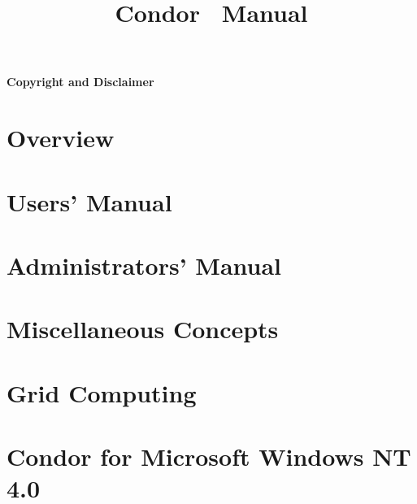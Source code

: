 \documentclass[titlepage,oneside]{book}
\begin{document}
\title{Condor\textsuperscript{\small{\textregistered}} \VersionNotice\ Manual}
\author{\AuthorNotice}
\maketitle


\tableofcontents

\sloppy
\begin{small}
\subsubsection*{Copyright and Disclaimer}
\label{sec:copyright-and-disclaimer}

\end{small}

\newpage
{}

\chapter{Overview}
\label{overview}


\chapter{Users' Manual}
\label{user-manual}


\chapter{Administrators' Manual}
\label{admin-manual}


\chapter{Miscellaneous Concepts}




\chapter{Grid Computing}
\label{grid-computing}




\chapter{Condor for Microsoft Windows NT 4.0}
\label{condor-nt}


\end{document}
